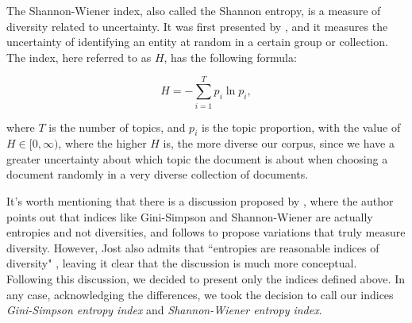 The Shannon-Wiener index, also called the Shannon entropy, is a measure of diversity related to uncertainty. It was first presented by \cite{shannon_mathematical_1948}, and it measures the uncertainty of identifying an entity at random in a certain group or collection. The index, here referred to as $H$, has the following formula:

\begin{equation}
H = - \sum^{T}_{i = 1} p_{i} \ln{p_{i}},
\label{h_entropy}
\end{equation}

\noindent where $T$ is the number of topics, and $p_{i}$ is the topic proportion, with the value of $H \in [0, \infty)$, where the higher $H$ is, the more diverse our corpus, since we have a greater uncertainty about which topic the document is about when choosing a document randomly in a very diverse collection of documents.

It's worth mentioning that there is a discussion proposed by \cite{jost_entropy_2006}, where the author points out that indices like Gini-Simpson and Shannon-Wiener are actually entropies and not diversities, and follows to propose variations that truly measure diversity. However, Jost also admits that ``entropies are reasonable indices of diversity" \citep[p. 363]{jost_entropy_2006}, leaving it clear that the discussion is much more conceptual. Following this discussion, we decided to present only the indices defined above. In any case, acknowledging the differences, we took the decision to call our indices \textit{Gini-Simpson entropy index} and \textit{Shannon-Wiener entropy index}.